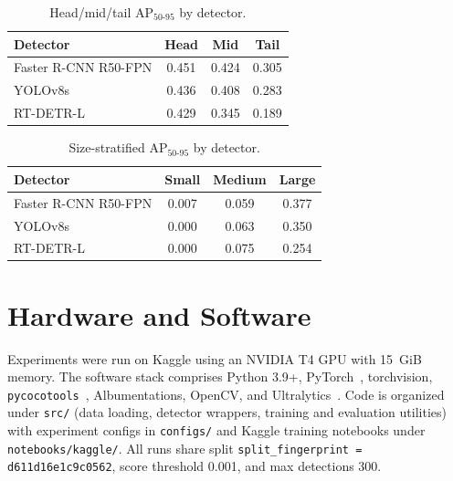 \documentclass[11pt,a4paper]{article}
\begin{document}
\begin{table}[H]
\centering
\small
\caption{Head/mid/tail AP$_{50\text{-}95}$ by detector.}
\label{tab:hmt}
\begin{tabular}{@{}lccc@{}}
\toprule
Detector & Head & Mid & Tail \\
\midrule
Faster R-CNN R50-FPN & 0.451 & 0.424 & 0.305 \\
YOLOv8s & 0.436 & 0.408 & 0.283 \\
RT-DETR-L & 0.429 & 0.345 & 0.189 \\
\bottomrule
\end{tabular}
\end{table}

\begin{table}[H]
\centering
\small
\caption{Size-stratified AP$_{50\text{-}95}$ by detector.}
\label{tab:size-full}
\begin{tabular}{@{}lccc@{}}
\toprule
Detector & Small & Medium & Large \\
\midrule
Faster R-CNN R50-FPN & 0.007 & 0.059 & 0.377 \\
YOLOv8s & 0.000 & 0.063 & 0.350 \\
RT-DETR-L & 0.000 & 0.075 & 0.254 \\
\bottomrule
\end{tabular}
\end{table}

\section{Hardware and Software}
\label{app:repro}
Experiments were run on Kaggle using an NVIDIA T4 GPU with 15~GiB memory. The software stack comprises Python 3.9+, PyTorch~\cite{paszke2019pytorch}, torchvision, \texttt{pycocotools}~\cite{pycocotools}, Albumentations, OpenCV, and Ultralytics~\cite{ultralytics}. Code is organized under \texttt{src/} (data loading, detector wrappers, training and evaluation utilities) with experiment configs in \texttt{configs/} and Kaggle training notebooks under \texttt{notebooks/kaggle/}. All runs share split \texttt{split\_fingerprint = d611d16e1c9c0562}, score threshold 0.001, and max detections 300.
\end{document}
